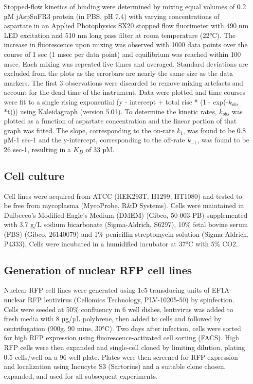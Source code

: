 \documentclass[9pt,lineno]{elife}
\begin{document}
Stopped-flow kinetics of binding were determined by mixing equal volumes of 0.2 µM jAspSnFR3 protein (in PBS, pH 7.4) with varying concentrations of aspartate in an Applied Photophysics SX20 stopped flow fluorimeter with 490 nm LED excitation and 510 nm long pass filter at room temperature (22°C).
The increase in fluorescence upon mixing was observed with 1000 data points over the course of 1 sec (1 msec per data point) and equilibrium was reached within 100 msec.
Each mixing was repeated five times and averaged.
Standard deviations are excluded from the plots as the errorbars are nearly the same size as the data markers.
The first 3 observations were discarded to remove mixing artefacts and account for the dead time of the instrument.
Data were plotted and time courses were fit to a single rising exponential (y - intercept + total rise * (1 - exp(-$k_{obs}$*t))) using Kaleidagraph (version 5.01).
To determine the kinetic rates, $k_{obs}$ was plotted as a function of aspartate concentration and the linear portion of that graph was fitted.
The slope, corresponding to the on-rate $k_1$, was found to be 0.8 µM-1 sec-1 and the y-intercept, corresponding to the off-rate $k_{-1}$, was found to be 26 sec-1, resulting in a $K_D$ of 33 µM.


\subsection{Cell culture}
Cell lines were acquired from ATCC (HEK293T, H1299, HT1080) and tested to be free from mycoplasma (MycoProbe, R\&D Systems).
Cells were maintained in Dulbecco’s Modified Eagle’s Medium (DMEM) (Gibco, 50-003-PB) supplemented with 3.7 g/L sodium bicarbonate (Sigma-Aldrich, S6297), 10\% fetal bovine serum (FBS) (Gibco, 26140079) and 1\% penicillin-streptomycin solution (Sigma-Aldrich, P4333).
Cells were incubated in a humidified incubator at 37°C with 5\% CO2.

\subsection{Generation of nuclear RFP cell lines}
Nuclear RFP cell lines were generated using 1e5 transducing units of EF1A-nuclear RFP lentivirus (Cellomics Technology, PLV-10205-50) by spinfection.
Cells were seeded at 50\% confluency in 6 well dishes, lentivirus was added to fresh media with 8 µg/µL polybrene, then added to cells and followed by centrifugation (900g, 90 mins, 30°C).
Two days after infection, cells were sorted for high RFP expression using fluorescence-activated cell sorting (FACS).
High RFP cells were then expanded and single-cell cloned by limiting dilution, plating 0.5 cells/well on a 96 well plate.
Plates were then screened for RFP expression and localization using Incucyte S3 (Sartorius) and a suitable clone chosen, expanded, and used for all subsequent experiments.
\end{document}

